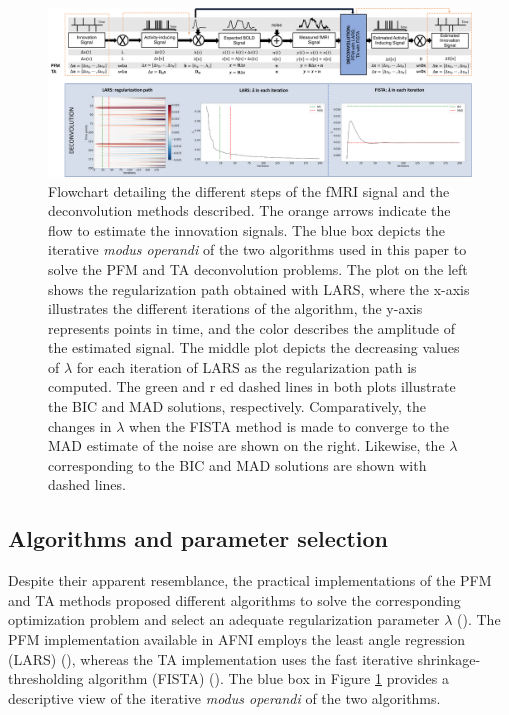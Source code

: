 \begin{figure}[t!]
    \begin{center}
        \includegraphics[width=\columnwidth]{figures/flowchart.pdf}
    \end{center}
    \caption{Flowchart detailing the different steps of the fMRI signal and the deconvolution methods described. The orange arrows indicate the flow to estimate the innovation signals. The blue box depicts the iterative \textit{modus operandi} of the two algorithms used in this paper to solve the PFM and TA deconvolution problems. The plot on the left shows the regularization path obtained with LARS, where the x-axis illustrates the different iterations of the algorithm, the y-axis represents points in time, and the color describes the amplitude of the estimated signal. The middle plot depicts the decreasing values of $\lambda$ for each iteration of LARS as the regularization path is computed. The green and r ed dashed lines in both plots illustrate the BIC and MAD solutions, respectively. Comparatively, the changes in $\lambda$ when the FISTA method is made to converge to the MAD estimate of the noise are shown on the right. Likewise, the $\lambda$ corresponding to the BIC and MAD solutions are shown with dashed lines.}
\label{fig:flowchart}
\end{figure}

\subsection{Algorithms and parameter selection}
\label{sec:regparam}
Despite their apparent resemblance, the practical implementations of the PFM and TA methods proposed different algorithms to solve the corresponding optimization problem and select an adequate regularization parameter $\lambda$ (\citealt{Gaudes2013Paradigmfreemapping,Karahanoglu2013TotalactivationfMRI}). The PFM implementation available in AFNI employs the least angle regression (LARS) (\citealt{Efron2004Leastangleregression}), whereas the TA implementation uses the fast iterative shrinkage-thresholding algorithm (FISTA) (\citealt{Beck2009FastIterativeShrinkage}). The blue box in Figure \ref{fig:flowchart} provides a descriptive view of the iterative \textit{modus operandi} of the two algorithms.

